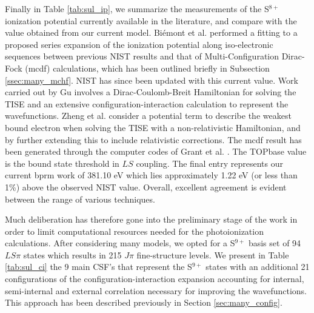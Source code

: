 Finally in Table \ref{tab:sul_ip}, we summarize the measurements of the S$^{8+}$ ionization potential currently available in the literature, and compare with the value obtained from our current model. Bi\'{e}mont et al. \cite{1999ADNDT..71..117B} performed a fitting to a proposed series expansion of the ionization potential along iso-electronic sequences between previous NIST results and that of Multi-Configuration Dirac-Fock ({\sc mcdf}) calculations, which has been outlined briefly in Subsection \ref{ssec:many_mchf}. NIST has since been updated with this current value. Work carried out by Gu \cite{2005ADNDT..89..267G} involves a Dirac-Coulomb-Breit Hamiltonian for solving the TISE and an extensive configuration-interaction calculation to represent the wavefunctions. Zheng et al. \cite{2002PhRvA..65e2510Z} consider a potential term to describe the weakest bound electron when solving the TISE with a non-relativistic Hamiltonian, and by further extending this to include relativistic corrections. The {\sc mcdf} result has been generated through the computer codes of Grant et al. \cite{1980CoPhC..21..207G}. The TOPbase value is the bound state threshold in $LS$ coupling. The final entry represents our current {\sc bprm} work of 381.10 eV which lies approximately 1.22 eV (or less than 1\%) above the observed NIST value. Overall, excellent agreement is evident between the range of various techniques.

Much deliberation has therefore gone into the preliminary stage of the work in order to limit computational resources needed for the photoionization calculations. After considering many models, we opted for a S$^{9+}$ basis set of 94 $LS\pi$ states which results in 215 $J\pi$ fine-structure levels. We present in Table \ref{tab:sul_ci} the 9 main CSF's that represent the S$^{9+}$ states with an additional 21 configurations of the configuration-interaction expansion accounting for internal, semi-internal and external correlation necessary for improving the wavefunctions. This approach has been described previously in Section \ref{sec:many_config}.

                           

